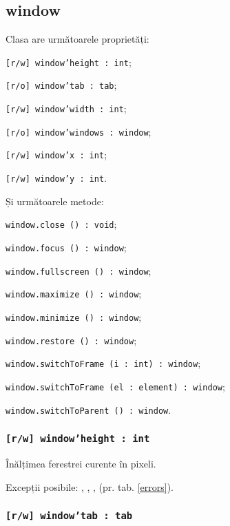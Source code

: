 \subsection{window}

Clasa \window{} are următoarele proprietăți:
\begin{icItems}
	\item \texttt{[r/w] window'height : int};
	\item \texttt{[r/o] window'tab : tab};
	\item \texttt{[r/w] window'width : int};
	\item \texttt{[r/o] window'windows : window};
	\item \texttt{[r/w] window'x : int};
	\item \texttt{[r/w] window'y : int}.
\end{icItems}

Și următoarele metode:
\begin{icItems}
	\item \texttt{window.close () : void};
	\item \texttt{window.focus () : window};
	\item \texttt{window.fullscreen () : window};
	\item \texttt{window.maximize () : window};
	\item \texttt{window.minimize () : window};
	\item \texttt{window.restore () : window};
	\item \texttt{window.switchToFrame (i : int) : window};
	\item \texttt{window.switchToFrame (el : element) : window};
	\item \texttt{window.switchToParent () : window}.
\end{icItems}

\subsubsection{\texttt{[r/w] window'height : int}}

Înălțimea ferestrei curente în pixeli.

Excepții posibile: , , ,  (pr. tab. \ref{errors}).

\subsubsection{\texttt{[r/w] window'tab : tab}}

